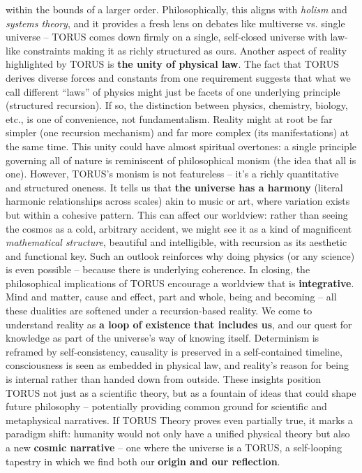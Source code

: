 \documentclass[
]{article}
\begin{document}
\begin{itemize}
  within the bounds of a larger order. Philosophically, this aligns with
  \emph{holism} and \emph{systems theory}, and it provides a fresh lens
  on debates like multiverse vs. single universe -- TORUS comes down
  firmly on a single, self-closed universe with law-like constraints
  making it as richly structured as ours. Another aspect of reality
  highlighted by TORUS is \textbf{the unity of physical law}. The fact
  that TORUS derives diverse forces and constants from one requirement
  suggests that what we call different ``laws'' of physics might just be
  facets of one underlying principle (structured recursion). If so, the
  distinction between physics, chemistry, biology, etc., is one of
  convenience, not fundamentalism. Reality might at root be far simpler
  (one recursion mechanism) and far more complex (its manifestations) at
  the same time. This unity could have almost spiritual overtones: a
  single principle governing all of nature is reminiscent of
  philosophical monism (the idea that all is one). However, TORUS's
  monism is not featureless -- it's a richly quantitative and structured
  oneness. It tells us that \textbf{the universe has a harmony} (literal
  harmonic relationships across scales\hspace{0pt}) akin to music or
  art, where variation exists but within a cohesive pattern. This can
  affect our worldview: rather than seeing the cosmos as a cold,
  arbitrary accident, we might see it as a kind of magnificent
  \emph{mathematical structure}, beautiful and intelligible, with
  recursion as its aesthetic and functional key. Such an outlook
  reinforces why doing physics (or any science) is even possible --
  because there is underlying coherence. In closing, the philosophical
  implications of TORUS encourage a worldview that is
  \textbf{integrative}. Mind and matter, cause and effect, part and
  whole, being and becoming -- all these dualities are softened under a
  recursion-based reality. We come to understand reality as \textbf{a
  loop of existence that includes us}, and our quest for knowledge as
  part of the universe's way of knowing itself. Determinism is reframed
  by self-consistency, causality is preserved in a self-contained
  timeline, consciousness is seen as embedded in physical law, and
  reality's reason for being is internal rather than handed down from
  outside. These insights position TORUS not just as a scientific
  theory, but as a fountain of ideas that could shape future philosophy
  -- potentially providing common ground for scientific and metaphysical
  narratives. If TORUS Theory proves even partially true, it marks a
  paradigm shift: humanity would not only have a unified physical theory
  but also a new \textbf{cosmic narrative} -- one where the universe is
  a TORUS, a self-looping tapestry in which we find both our
  \textbf{origin and our reflection}.
\end{itemize}
\end{document}
